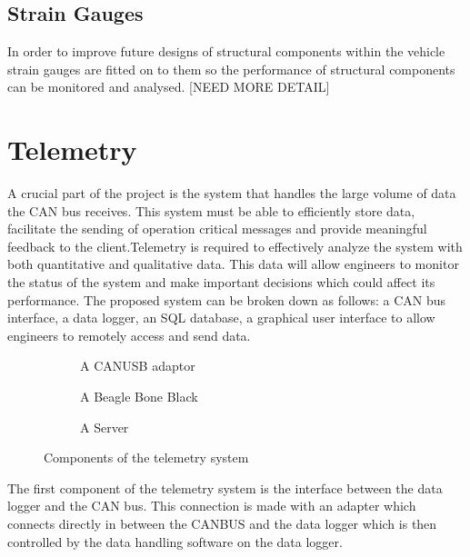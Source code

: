 \documentclass[10pt,a4paper]{article}
\begin{document}
\subsection{Strain Gauges}
In order to improve future designs of structural components within the vehicle strain gauges are fitted on to them so the performance of structural components can be monitored and analysed. [NEED MORE DETAIL]


\section{Telemetry}
A crucial part of the project is the system that handles the large volume of data the CAN bus receives. This system must be able to efficiently store data, facilitate the sending of operation critical messages and provide meaningful feedback to the client.Telemetry is required to effectively analyze the system with both quantitative and qualitative data. This data will allow engineers to monitor the status of the system and make important decisions which could affect its performance. The proposed system can be broken down as follows: a CAN bus interface, a data logger, an SQL database, a graphical user interface to allow engineers to remotely access and send data.
\begin{figure}
         \centering
         \begin{subfigure}[b]{0.6\textwidth}
                 \caption{A CANUSB adaptor}
                 \label{fig:CANUSB adaptor}
         \end{subfigure}

         \begin{subfigure}[b]{0.4\textwidth}
                 \caption{A Beagle Bone Black}
                 \label{fig:Beable Bone Black}
         \end{subfigure}

         \begin{subfigure}[b]{0.5\textwidth}
                 \caption{A Server}
                 \label{fig:Sever}
         \end{subfigure}
         \caption{Components of the telemetry system}\label{fig:telemetry}
\end{figure}
The first component of the telemetry system is the interface between the data logger and the CAN bus. This connection is made with an adapter which connects directly in between the CANBUS and the data logger which is then controlled by the data handling software on the data logger.
\end{document}
